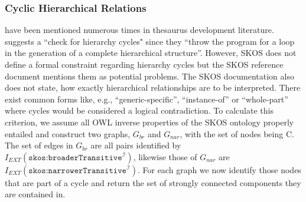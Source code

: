\subsubsection{Cyclic Hierarchical Relations} have been mentioned numerous times in thesaurus development literature. \cite{Soergel2002} suggests a ``check for hierarchy cycles" since they ``throw the program for a loop in the generation of a complete hierarchical structure''. However, SKOS does not define a formal constraint regarding hierarchy cycles but the SKOS reference document mentions them as potential problems. The SKOS documentation also does not state, how exactly hierarchical relationships are to be interpreted. There exist common forms like, e.g., ``generic-specific'', ``instance-of'' or ``whole-part'' \cite{Hedden2010,Harpring2010,Aitchison2000} where cycles would be considered a logical contradiction. To calculate this criterion, we assume all OWL inverse properties of the SKOS ontology properly entailed and construct two graphs, $G_{br}$ and $G_{nar}$, with the set of nodes being C. The set of edges in $G_{br}$ are all pairs identified by $I_{EXT}(\texttt{skos:broaderTransitive}^\mathcal{I})$, likewise those of $G_{nar}$ are $I_{EXT}(\texttt{skos:narrowerTransitive}^\mathcal{I})$. For each graph we now identify those nodes that are part of a cycle and return the set of strongly connected components they are contained in.

 


